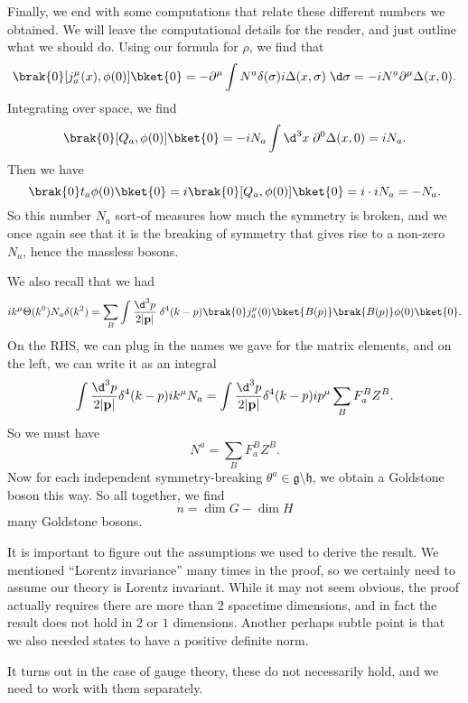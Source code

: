 \documentclass[a4paper]{article}
\begin{document}
Finally, we end with some computations that relate these different numbers we obtained. We will leave the computational details for the reader, and just outline what we should do. Using our formula for $\rho$, we find that
\[
  \brak{0} [j_a^\mu(x), \phi(0)] \bket{0} = - \partial^\mu \int N^a \delta (\sigma) i \Delta(x, \sigma) \;\d \sigma = -iN^a \partial^\mu \Delta(x, 0).
\]
Integrating over space, we find
\[
  \brak{0}[Q_a, \phi(0)]\bket{0} = - iN_a \int \d^3 x\; \partial^0 \Delta(x, 0) = i N_a.
\]
Then we have
\[
  \brak{0} t_a \phi(0)\bket{0} = i \brak{0} [Q_a, \phi(0)]\bket{0} = i \cdot i N_a = -N_a.
\]
So this number $N_a$ sort-of measures how much the symmetry is broken, and we once again see that it is the breaking of symmetry that gives rise to a non-zero $N_a$, hence the massless bosons.

We also recall that we had
\[
  i k^\mu \Theta(k^0) N_a \delta(k^2) = \sum_B \int \frac{\d^3 p}{2|\mathbf{p}|}\; \delta^4(k - p) \brak{0} j_a^\mu(0) \bket{B(p)} \brak{B(p)} \phi(0) \bket{0}.
\]
On the RHS, we can plug in the names we gave for the matrix elements, and on the left, we can write it as an integral
\[
  \int \frac{\d^3 p}{2|\mathbf{p}|} \delta^4 (k - p) i k^\mu N_a = \int \frac{\d^3 p}{2|\mathbf{p}|} \delta^4(k - p) i p^\mu \sum_B F_a^B Z^B.
\]
So we must have
\[
  N^a = \sum_B F_a^B Z^B.
\]
Now for each independent symmetry-breaking $\theta^a \in \mathfrak{g} \setminus \mathfrak{h}$, we obtain a Goldstone boson this way. So all together, we find
\[
  n = \dim G - \dim H
\]
many Goldstone bosons.

%

It is important to figure out the assumptions we used to derive the result. We mentioned ``Lorentz invariance'' many times in the proof, so we certainly need to assume our theory is Lorentz invariant. While it may not seem obvious, the proof actually requires there are more than $2$ spacetime dimensions, and in fact the result does not hold in $2$ or $1$ dimensions. Another perhaps subtle point is that we also needed states to have a positive definite norm. %

It turns out in the case of gauge theory, these do not necessarily hold, and we need to work with them separately.

\end{document}
